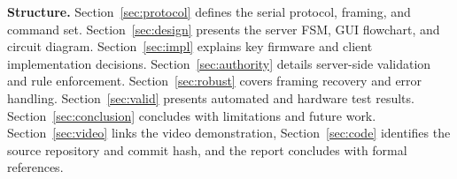 \textbf{Structure.}
Section~\ref{sec:protocol} defines the serial protocol, framing, and command set.
Section~\ref{sec:design} presents the server FSM, GUI flowchart, and circuit diagram.
Section~\ref{sec:impl} explains key firmware and client implementation decisions.
Section~\ref{sec:authority} details server-side validation and rule enforcement.
Section~\ref{sec:robust} covers framing recovery and error handling.
Section~\ref{sec:valid} presents automated and hardware test results.
Section~\ref{sec:conclusion} concludes with limitations and future work.
Section~\ref{sec:video} links the video demonstration, Section~\ref{sec:code} identifies the source repository and commit hash, and the report concludes with formal references.
